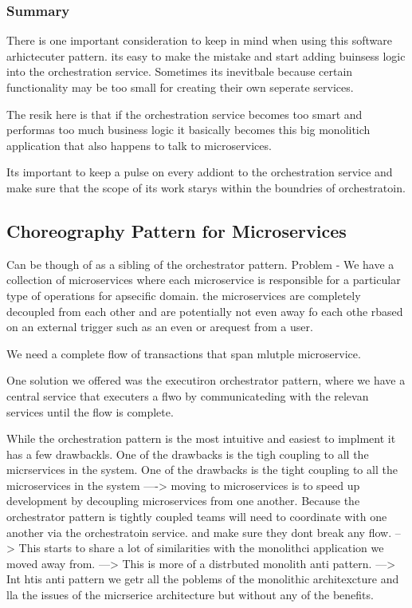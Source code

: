 \documentclass[a4paper, 11pt]{book}
\begin{document}
    \subsubsection{Summary}
    There is one important consideration to keep in mind when using this software arhictecuter pattern.
    its easy to make the mistake and start adding buinsess logic into the orchestration service.
    Sometimes its inevitbale because certain functionality may be too small for creating their own seperate services.

    The resik here is that if the orchestration service becomes too smart and performas too much business logic it basically becomes this big monolitich application that also happens to talk to microservices.

    Its important to keep a pulse on every addiont to the orchestration service and make sure that the scope of its work starys within the boundries of orchestratoin.

    \subsection{Choreography Pattern for Microservices}
    Can be though of as a sibling of the orchestrator pattern.
    Problem - We have a collection of microservices where each microservice is responsible for a particular type of operations for apsecific domain.
    the microservices are completely decoupled from each other and are potentially not even away fo each othe rbased on an external trigger such as an even or arequest from a user.

    We need a complete flow of transactions that span mlutple microservice.

    One solution we offered was the executiron orchestrator pattern, where we have a central service that executers a flwo by communicateding with the relevan services until the flow is complete.

    While the orchestration pattern is the most intuitive and easiest to implment it has a few drawbackls.
    One of the drawbacks is the tigh coupling to all the micrservices in the system.
    One of the drawbacks is the tight coupling to all the microservices in the system
    ----> moving to microservices is to speed up development by decoupling microservices from one another.
    Because the orchestrator pattern is tightly coupled teams will need to coordinate with one another via the orchestratoin service. and make sure they dont break any flow.
    --> This starts to share a lot of similarities with the monolithci application we moved away from.
    ---> This is more of a distrbuted monolith anti pattern.
    ---> Int htis anti pattern we getr all the poblems of the monolithic architexcture and lla the issues of the micrserice architecture but without any of the benefits.
\end{document}
